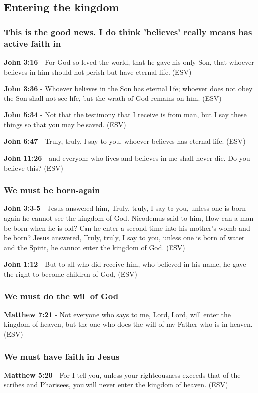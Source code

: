 \documentclass[11pt]{article}
\begin{document}
\subsection{Entering the kingdom}
\label{sec:org5a2742e}
\subsubsection{This is the good news. I do think 'believes' really means has active faith in}
\label{sec:orgb24ce53}
\textbf{John 3:16} - For God so loved the world, that he gave his only Son, that whoever believes in him should not perish but have eternal life. (ESV)

\textbf{John 3:36} - Whoever believes in the Son has eternal life; whoever does not obey the Son shall not see life, but the wrath of God remains on him. (ESV)

\textbf{John 5:34} - Not that the testimony that I receive is from man, but I say these things so that you may be saved. (ESV)

\textbf{John 6:47} - Truly, truly, I say to you, whoever believes has eternal life. (ESV)

\textbf{John 11:26} - and everyone who lives and believes in me shall never die. Do you believe this? (ESV)

\subsubsection{We must be born-again}
\label{sec:org5d75828}
\textbf{John 3:3-5} - Jesus answered him, Truly, truly, I say to you, unless one is born again he cannot see the kingdom of God.  Nicodemus said to him, How can a man be born when he is old?  Can he enter a second time into his mother's womb and be born?  Jesus answered, Truly, truly, I say to you, unless one is born of water and the Spirit, he cannot enter the kingdom of God. (ESV)

\textbf{John 1:12} - But to all who did receive him, who believed in his name, he gave the right to become children of God, (ESV)

\subsubsection{We must do the will of God}
\label{sec:orgb3311a5}
\textbf{Matthew 7:21} - Not everyone who says to me, Lord, Lord, will enter the kingdom of heaven, but the one who does the will of my Father who is in heaven. (ESV)

\subsubsection{We must have faith in Jesus}
\label{sec:org414b401}
\textbf{Matthew 5:20} - For I tell you, unless your righteousness exceeds that of the scribes and Pharisees, you will never enter the kingdom of heaven. (ESV)
\end{document}
